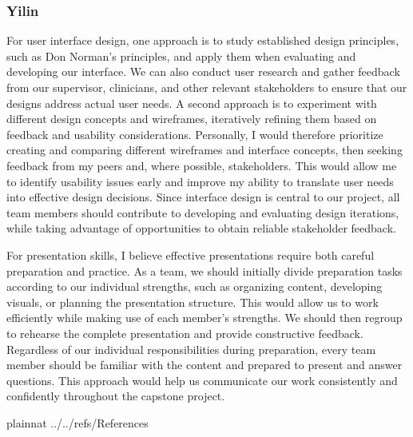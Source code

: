 \documentclass[12pt]{article}
\begin{document}
\subsubsection*{Yilin}
For user interface design, one approach is to study established design principles, such as Don Norman’s principles, and apply them when evaluating and developing our interface. We can also conduct user research and gather feedback from our supervisor, clinicians, and other relevant stakeholders to ensure that our designs address actual user needs. A second approach is to experiment with different design concepts and wireframes, iteratively refining them based on feedback and usability considerations. Personally, I would therefore prioritize creating and comparing different wireframes and interface concepts, then seeking feedback from my peers and, where possible, stakeholders. This would allow me to identify usability issues early and improve my ability to translate user needs into effective design decisions. Since interface design is central to our project, all team members should contribute to developing and evaluating design iterations, while taking advantage of opportunities to obtain reliable stakeholder feedback.

For presentation skills, I believe effective presentations require both careful preparation and practice. As a team, we should initially divide preparation tasks according to our individual strengths, such as organizing content, developing visuals, or planning the presentation structure. This would allow us to work efficiently while making use of each member’s strengths. We should then regroup to rehearse the complete presentation and provide constructive feedback. Regardless of our individual responsibilities during preparation, every team member should be familiar with the content and prepared to present and answer questions. This approach would help us communicate our work consistently and confidently throughout the capstone project.

\newpage

 {plainnat}
 {../../refs/References}

\newpage
\end{document}
